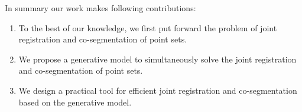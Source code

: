 In summary our work makes following contributions: 
\begin{enumerate}
	\item To the best of our knowledge, we first put forward the problem of joint registration and co-segmentation of point sets.
	
	\item We propose a generative model to simultaneously solve the joint registration and co-segmentation of point sets.
	
	\item We design a practical tool for efficient joint registration and co-segmentation based on the generative model. 
	
\end{enumerate}

